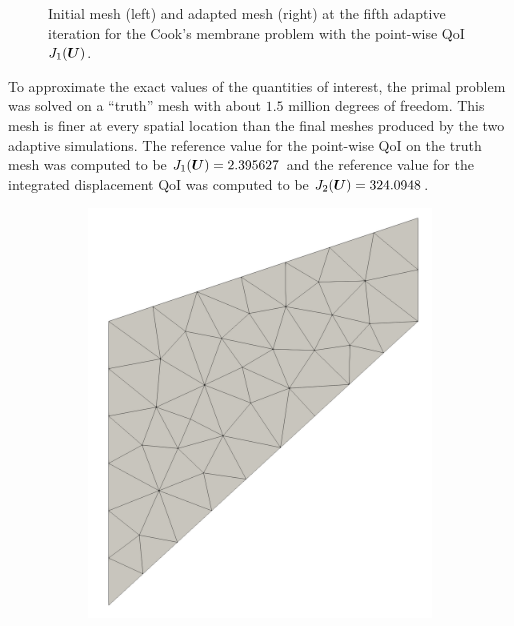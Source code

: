 \begin{figure}[ht!]
\begin{subfigure}{.5\textwidth}
\end{subfigure}
\caption{Initial mesh (left) and adapted mesh (right) at the fifth
adaptive iteration for the Cook's membrane problem with the point-wise
QoI $J_1(\boldsymbol{U})$.}
\label{fig:mech_cooks_pw_meshes}
\end{figure}

To approximate the exact values of the quantities of interest, the primal
problem was solved on a ``truth'' mesh with about $1.5$ million degrees of
freedom. This mesh is finer at every spatial location than the final meshes
produced by the two adaptive simulations. The reference value for the
point-wise QoI on the truth mesh was computed to be
$J_1(\boldsymbol{U}) = 2.395627$ and the reference value for the integrated
displacement QoI was computed to be $J_2(\boldsymbol{U}) = 324.0948$.

\begin{figure}[ht!]
\centering
\begin{subfigure}{.5\textwidth}
\centering
\includegraphics[width=.99\linewidth]{img/mech_cooks_avg_u_initial_mesh.png}
\end{subfigure}%
\begin{subfigure}{.5\textwidth}

\end{subfigure}
\end{figure}
